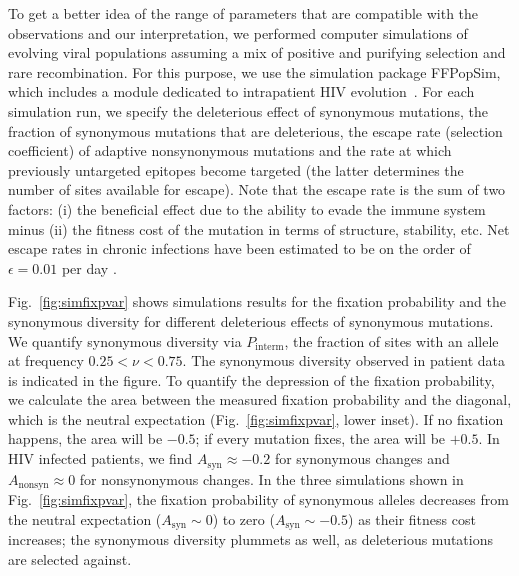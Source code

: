 \documentclass[rmp, twocolumn]{revtex4}
\newcommand{\FIG}[1]{Fig.~\ref{fig:#1}}
\begin{document}
To get a better idea of the range of parameters that are compatible with the
observations and our interpretation, we performed computer simulations of
evolving viral populations assuming a mix of positive and purifying selection
and rare recombination.  For this purpose, we use the simulation package
FFPopSim, which includes a module dedicated to intrapatient HIV
evolution~\citep{zanini_ffpopsim:_2012}. For each simulation run, we specify the
deleterious effect of synonymous mutations, the fraction of synonymous mutations
that are deleterious, the escape rate (selection coefficient) of adaptive 
nonsynonymous mutations and the rate at which previously untargeted epitopes
become targeted (the latter determines the number of sites available for escape). 
Note that the escape rate is the sum of two
factors: (i) the beneficial effect due to the ability to evade the immune system
minus (ii) the fitness cost of the mutation in terms of structure, stability,
etc. Net escape rates in chronic infections have been estimated to be on the
order of $\epsilon = 0.01$ per day \citep{neher_recombination_2010,
Asquith:2006p28003}.

\FIG{simfixpvar} shows simulations results for the fixation probability and the
synonymous diversity for different deleterious effects of synonymous mutations.
We quantify synonymous diversity via $P_\text{interm}$, the fraction of sites
with an allele at frequency $0.25 < \nu < 0.75$. The synonymous diversity
observed in patient data is indicated in the figure.  To quantify the depression
of the fixation probability, we calculate the area between the measured fixation
probability and the diagonal, which is the neutral expectation
(\FIG{simfixpvar}, lower inset). If no fixation happens, the area will be
$-0.5$; if every mutation fixes, the area will be $+0.5$. In HIV infected
patients, we find $A_\text{syn} \approx -0.2$ for synonymous changes and
$A_\text{nonsyn} \approx 0$ for nonsynonymous changes. In the three simulations
shown in \FIG{simfixpvar}, the fixation probability of synonymous alleles
decreases from the neutral expectation ($A_\text{syn} \sim 0$) to zero
($A_\text{syn} \sim -0.5$) as their fitness cost increases; the synonymous
diversity plummets as well, as deleterious mutations are selected against.
\end{document}
